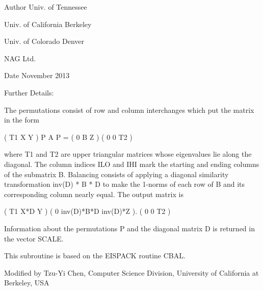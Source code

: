 \begin{DoxyAuthor}{Author}
Univ. of Tennessee 

Univ. of California Berkeley 

Univ. of Colorado Denver 

N\+A\+G Ltd. 
\end{DoxyAuthor}
\begin{DoxyDate}{Date}
November 2013 
\end{DoxyDate}
\begin{DoxyParagraph}{Further Details\+: }
\begin{DoxyVerb}  The permutations consist of row and column interchanges which put
  the matrix in the form

             ( T1   X   Y  )
     P A P = (  0   B   Z  )
             (  0   0   T2 )

  where T1 and T2 are upper triangular matrices whose eigenvalues lie
  along the diagonal.  The column indices ILO and IHI mark the starting
  and ending columns of the submatrix B. Balancing consists of applying
  a diagonal similarity transformation inv(D) * B * D to make the
  1-norms of each row of B and its corresponding column nearly equal.
  The output matrix is

     ( T1     X*D          Y    )
     (  0  inv(D)*B*D  inv(D)*Z ).
     (  0      0           T2   )

  Information about the permutations P and the diagonal matrix D is
  returned in the vector SCALE.

  This subroutine is based on the EISPACK routine CBAL.

  Modified by Tzu-Yi Chen, Computer Science Division, University of
    California at Berkeley, USA\end{DoxyVerb}
 
\end{DoxyParagraph}
\hypertarget{group__complex16GEcomputational_gad5a784fc93cbf57b6b8ff3f0ff229cbe}{}
